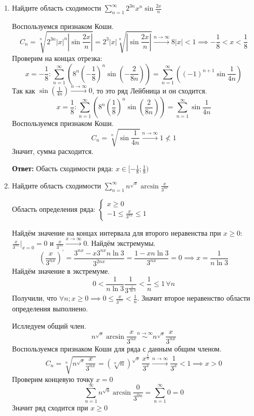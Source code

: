 \documentclass[10pt]{article} %
\begin{document}
\begin{large}
\begin{enumerate}
\item Найдите область сходимости $ \sum\limits_{n=1}^{\infty}2^{3n}x^n \sin \frac{2x}{n} $

Воспользуемся признаком Коши.
\[ C_{n} = \sqrt[n]{ 2^{3n} |x|^n \left| \sin \frac{2x}{n} \right| } = 2^3 |x| \sqrt[n]{\left| \sin \frac{2x}{n} \right|} 
\xrightarrow{n\to\infty} 8 |x| < 1 \implies -\frac{1}{8} < x < \frac{1}{8} \]
Проверим на концах отрезка:
\[ x = -\frac{1}{8}: \sum_{n=1}^{\infty} \left( 8^{n} \left( -\frac{1}{8} \right)^n \sin \left( -\frac{2}{8n} \right) \right) = \sum_{n=1}^{\infty} \left( (-1)^{n+1} \sin \frac{1}{4n} \right)  \]
Так как $ \sin(\frac{1}{4n}) \xrightarrow{n\to\infty} 0 $, то это ряд Лейбница и он сходится.
\[ x = \frac{1}{8}: \sum_{n=1}^{\infty} \left( 8^{n} \left( \frac{1}{8} \right)^n \sin \left( \frac{2}{8n} \right) \right) = \sum_{n=1}^{\infty} \sin \frac{1}{4n}  \]
Воспользуемся признаком Коши.
\[ C_n = \sqrt[n]{\sin \frac{1}{4n}} \xrightarrow{n\to\infty} 1 \nless 1 \]
Значит, сумма расходится.

\textbf{Ответ:} Обасть сходимости ряда: $ x \in [ -\frac{1}{8}; \frac{1}{8} ) $

\item Найдите область сходимости $ \sum\limits_{n=1}^{\infty} n^{\sqrt{x}} \arcsin \frac{x}{3^{nx}} $

Область определения ряда:
$
\begin{cases}
    x \geq 0 \\
    -1 \leq \frac{x}{3^{nx}} \leq 1
\end{cases}
$

Найдём значение на концах интервала для второго неравенства при $x \geq 0: $ $ \frac{x}{3^{nx}} |_{x=0} = 0 $ и $ \frac{x}{3^{nx}} \xrightarrow{x\to\infty} 0 $.
Найдём экстремумы.
\[ \left( \frac{x}{3^{nx}} \right)^{'} = \frac{3^{nx} - x 3^{nx} n \ln 3}{3^{2nx}} = \frac{1-xn \ln3}{3^{nx}} = 0 \implies x = \frac{1}{n \ln3} \]
Найдём значение в экстремуме.
\[ 0 < \frac{1}{n\ln3} \frac{1}{3^{\frac{1}{\ln3}}} < \frac{1}{n} \leq 1 \, \forall n  \]
Получили, что $ \forall n; x \geq 0 \implies 0 \leq \frac{x}{3^{nx}} < \frac{1}{n}$. Значит второе неравенство области определения выполнено.

Ислледуем общий член.
\[ n^{\sqrt{x}} \arcsin \frac{x}{3^{nx}} \stackrel{n\to\infty}{\sim} n^{\sqrt{x}} \frac{x}{3^{nx}} \]
Воспользуемся признаком Коши для ряда с данным общим членом.
\[ C_n = \sqrt[n]{n^{\sqrt{x}} \frac{x}{3^{nx}}} =
(\sqrt[n]{n})^{\sqrt{x}} \, \frac{x^{\frac{1}{n}}}{3^x} \xrightarrow{n\to\infty} \frac{1}{3^x} < 1 \implies x > 0 \]
Проверим концевую точку $ x = 0 $
\[ \sum_{n=1}^{\infty} n^{\sqrt{0}} \arcsin \frac{0}{3^{0n}} = \sum_{n=1}^{\infty} 0 = 0  \]
Значит ряд сходится при $x \geq 0$


\end{enumerate}
\end{large}
\end{document}
